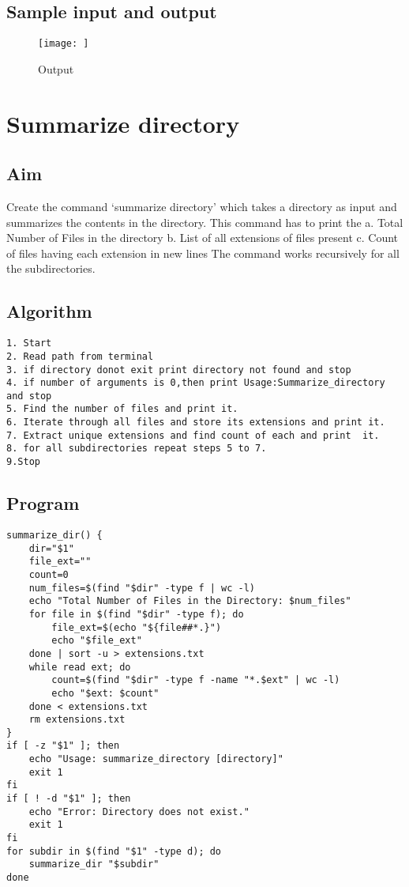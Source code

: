 \documentclass{article}
\begin{document}
\subsection{Sample input and output}
\begin{figure}[H]
    \centering
    \texttt{[image: ]}
    \caption{Output}
    \label{fig:my_label2}
\end{figure}
\section{\Large Summarize directory}
\subsection{Aim}
Create the command ‘summarize directory’ which takes a directory as input and summarizes
the contents in the directory. This command has to print the a. Total Number of Files in the
directory b. List of all extensions of files present c. Count of files having each extension in new
lines The command works recursively for all the subdirectories.
\subsection{Algorithm}
\begin{Verbatim}[tabsize = 4]
1. Start
2. Read path from terminal
3. if directory donot exit print directory not found and stop
4. if number of arguments is 0,then print Usage:Summarize_directory and stop
5. Find the number of files and print it.
6. Iterate through all files and store its extensions and print it.
7. Extract unique extensions and find count of each and print  it.
8. for all subdirectories repeat steps 5 to 7.
9.Stop
\end{Verbatim}
\subsection{Program}
\begin{Verbatim}[tabsize = 4]
summarize_dir() {
    dir="$1"
    file_ext=""
    count=0
    num_files=$(find "$dir" -type f | wc -l)
    echo "Total Number of Files in the Directory: $num_files"
    for file in $(find "$dir" -type f); do
        file_ext=$(echo "${file##*.}")
        echo "$file_ext"
    done | sort -u > extensions.txt
    while read ext; do
        count=$(find "$dir" -type f -name "*.$ext" | wc -l)
        echo "$ext: $count"
    done < extensions.txt
    rm extensions.txt
}
if [ -z "$1" ]; then
    echo "Usage: summarize_directory [directory]"
    exit 1
fi
if [ ! -d "$1" ]; then
    echo "Error: Directory does not exist."
    exit 1
fi
for subdir in $(find "$1" -type d); do
    summarize_dir "$subdir"
done
\end{Verbatim}
\thispagestyle{third}
\end{document}
